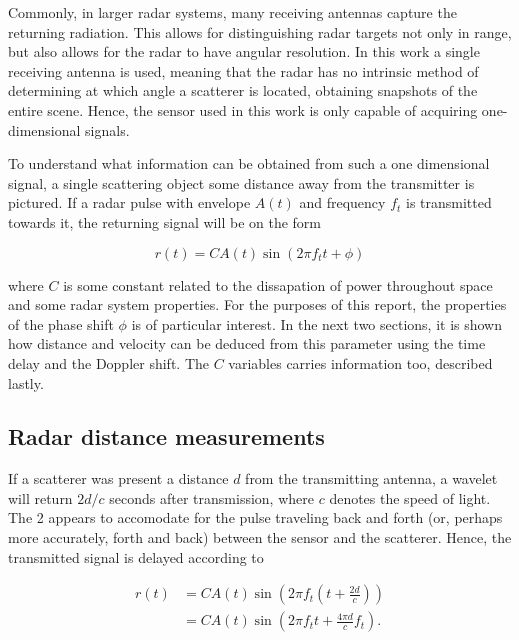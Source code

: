 Commonly, in larger radar systems, many receiving antennas capture the returning radiation. This allows for distinguishing radar targets not only in range, but also allows for the radar to have angular resolution. In this work a single receiving antenna is used, meaning that the radar has no intrinsic method of determining at which angle a scatterer is located, obtaining snapshots of the entire scene. Hence, the sensor used in this work is only capable of acquiring one-dimensional signals. 

To understand what information can be obtained from such a one dimensional signal, a single scattering object some distance away from the transmitter is pictured. If a radar pulse with envelope $A(t)$ and frequency $f_t$ is transmitted towards it, the returning signal will be on the form \citep{richards_2014}

\begin{equation}
	r(t) = CA(t)\sin(2\pi f_t t + \phi)
\end{equation}

where $C$ is some constant related to the dissapation of power throughout space and some radar system properties. For the purposes of this report, the properties of the phase shift $\phi$ is of particular interest. In the next two sections, it is shown how distance and velocity can be deduced from this parameter using the time delay and the Doppler shift. The $C$ variables carries information too, described lastly. 

\subsection{Radar distance measurements}

If a scatterer was present a distance $d$ from the transmitting antenna, a wavelet will return $2d/c$ seconds after transmission, where $c$ denotes the speed of light. The 2 appears to accomodate for the pulse traveling back and forth (or, perhaps more accurately, forth and back) between the sensor and the scatterer. Hence, the transmitted signal is delayed according to 

\begin{equation}
	\begin{split}
		r(t) 
		& = CA(t)\sin(2\pi f_t(t + \frac{2d}{c})) \\
		& = CA(t)\sin(2\pi f_tt + \frac{4\pi d}{c}f_t).
	\end{split}
\end{equation}

